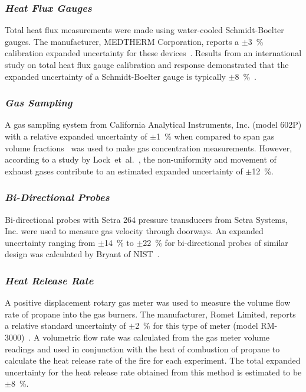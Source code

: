 \subsubsection*{\textit{Heat Flux Gauges}}
Total heat flux measurements were made using water-cooled Schmidt-Boelter gauges. The manufacturer, MEDTHERM Corporation, reports a $\pm$3~\% calibration expanded uncertainty for these devices~\cite{Medtherm:2003}. Results from an international study on total heat flux gauge calibration and response demonstrated that the expanded uncertainty of a Schmidt-Boelter gauge is typically $\pm$8~\%~\cite{Pitts:2006}.

\subsubsection*{\textit{Gas Sampling}}
A gas sampling system from California Analytical Instruments, Inc. (model 602P) with a relative expanded uncertainty of $\pm$1~\% when compared to span gas volume fractions~\cite{Bundy:2007} was used to make gas concentration measurements. However, according to a study by Lock~et~al.~\cite{Lock:1}, the non-uniformity and movement of exhaust gases contribute to an estimated expanded uncertainty of $\pm$12~\%.

\subsubsection*{\textit{Bi-Directional Probes}}
Bi-directional probes with Setra 264 pressure transducers from Setra Systems, Inc. were used to measure gas velocity through doorways. An expanded uncertainty ranging from $\pm$14~\% to $\pm$22~\% for bi-directional probes of similar design was calculated by Bryant of NIST~\cite{Bryant:FSJ2009}.

\subsubsection*{\textit{Heat Release Rate}}
A positive displacement rotary gas meter was used to measure the volume flow rate of propane into the gas burners. The manufacturer, Romet Limited, reports a relative standard uncertainty of $\pm$2~\% for this type of meter (model RM-3000)~\cite{Romet:2014}. A volumetric flow rate was calculated from the gas meter volume readings and used in conjunction with the heat of combustion of propane to calculate the heat release rate of the fire for each experiment. The total expanded uncertainty for the heat release rate obtained from this method is estimated to be $\pm8$~\%.